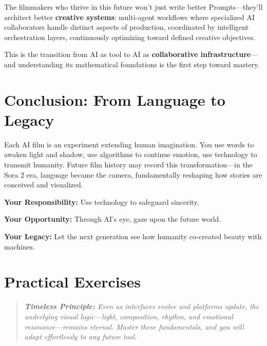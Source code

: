 The filmmakers who thrive in this future won't just write better Prompts—they'll architect better \textbf{creative systems}: multi-agent workflows where specialized AI collaborators handle distinct aspects of production, coordinated by intelligent orchestration layers, continuously optimizing toward defined creative objectives.

This is the transition from AI as tool to AI as \textbf{collaborative infrastructure}—and understanding its mathematical foundations is the first step toward mastery.

\section{Conclusion: From Language to Legacy}
\label{sec:conclusion}

Each AI film is an experiment extending human imagination. You use words to awaken light and shadow, use algorithms to continue emotion, use technology to transmit humanity. Future film history may record this transformation—in the Sora 2 era, language became the camera, fundamentally reshaping how stories are conceived and visualized.

\textbf{Your Responsibility:} Use technology to safeguard sincerity.

\textbf{Your Opportunity:} Through AI's eye, gaze upon the future world.

\textbf{Your Legacy:} Let the next generation see how humanity co-created beauty with machines.

\section*{Practical Exercises}

\begin{quote}
\textit{\textbf{Timeless Principle:} Even as interfaces evolve and platforms update, the underlying visual logic---light, composition, rhythm, and emotional resonance---remains eternal. Master these fundamentals, and you will adapt effortlessly to any future tool.}
\end{quote}


